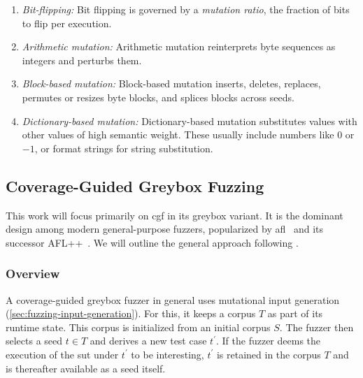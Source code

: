 \begin{enumerate}
  \item \emph{Bit-flipping:}
    Bit flipping is governed by a \emph{mutation ratio}, the fraction of bits to
    flip per execution.

  \item \emph{Arithmetic mutation:}
    Arithmetic mutation reinterprets byte sequences as integers and perturbs them.

  \item \emph{Block-based mutation:}
    Block-based mutation inserts, deletes, replaces, permutes or resizes byte blocks,
    and splices blocks across seeds.

  \item \emph{Dictionary-based mutation:}
    Dictionary-based mutation substitutes values with other values of high semantic
    weight. These usually include numbers like $0$ or $-1$, or format strings for
    string substitution.
\end{enumerate}

\subsection{Coverage-Guided Greybox Fuzzing}\label{sec:fuzzing-cgf}

This work will focus primarily on \gls{cgf} in its greybox variant.
It is the dominant design among modern general-purpose fuzzers, popularized by
\gls{afl}~\cite{zalewski2014afl} and its successor AFL++~\cite{fioraldi_afl_nodate}.
We will outline the general approach following \textcite{bohme_coverage-based_2016}.

\subsubsection{Overview}

A coverage-guided greybox fuzzer in general uses mutational input generation
(\cref{sec:fuzzing-input-generation}).
For this, it keeps a corpus $T$ as part of its runtime state.
This corpus is initialized from an initial corpus $S$.
The fuzzer then selects a seed $t\in T$ and derives a new test case $t^\prime$.
If the fuzzer deems the execution of the \gls{sut} under $t^\prime$ to be interesting, $t^\prime$
is retained in the corpus $T$ and is thereafter available as a seed itself.

